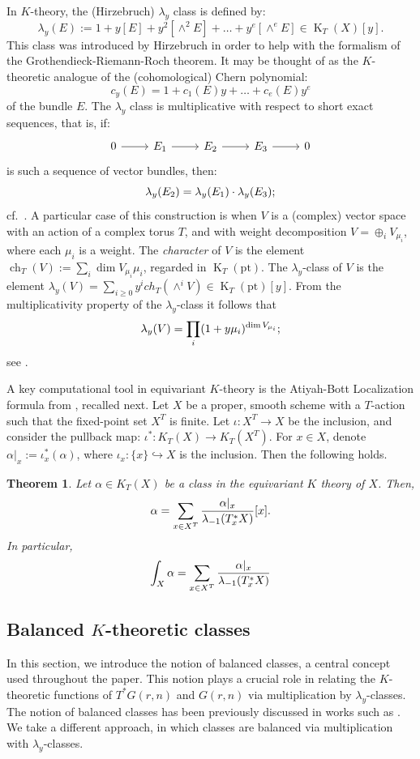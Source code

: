 \documentclass{amsart}
\newtheorem{thm}{Theorem}[section]
\DeclareMathOperator{\K}{K}
\DeclareMathOperator{\ch}{ch}
\begin{document}
In $K$-theory, the (Hirzebruch) $\lambda_y$ class is defined by: 
\[ \lambda_y(E) := 1 + y [E] + y^2 [\wedge^2 E] + \dots + y^e  [\wedge^e E] \in \K_T(X)[y]. \] 
This class was introduced by Hirzebruch \cite{MR1335917} in order to help with the 
formalism of the Grothendieck-Riemann-Roch theorem. It may be thought of as the 
$K$-theoretic analogue of the (cohomological) Chern polynomial: 
\[ c_y(E)= 1+ c_1(E) y + \ldots + c_e(E) y^e\] 
of the bundle $E$. 
The $\lambda_y$ class is multiplicative with respect to short exact sequences, that is, if: 
\[ \begin{tikzcd} 0 \arrow[r] & E_1 \arrow[r] & E_2 \arrow[r] & E_3 \arrow[r] & 0 \end{tikzcd} \] 
is such a sequence of vector bundles, then: 
\[ \lambda_y(E_2) = \lambda_y(E_1) \cdot \lambda_y(E_3) \/; \] 
cf.~\cite{MR1335917}. 
A particular case of this construction is when $V$ is a (complex) vector space with an action 
of a complex torus $T$, 
and with weight decomposition 
$V = \oplus_i V_{\mu_i}$, where each $\mu_i$ is a weight.
The {\em character} of $V$ is the element $\ch_T(V):=\sum_i \dim V_{\mu_i} {\mu_i}$, regarded  in $\K_T(\mathrm{pt})$.
The  $\lambda_y$-class of $V$ is the element 
$\lambda_y(V) =\sum_{i \ge 0} y^i ch_T(\wedge^i V) \in \K_T(\mathrm{pt})[y]$.
From the multiplicativity property of the $\lambda_y$-class it follows that 
\[\lambda_y(V) = \prod_i (1+y {\mu_i})^{\dim V_{\mu_i}} \/;\] 
see \cite{MR1335917}.

A key computational tool in equivariant $K$-theory is the Atiyah-Bott Localization formula from \cite{NIE}, recalled next.
Let $X$ be a proper, smooth scheme with a $T$-action such that the fixed-point set $X^T$ is finite. 
Let $\iota:X^T \to X$ 
be the inclusion, and consider the pullback map: 
$\iota^*: K_T(X) \to K_T(X^T)$. For $x \in X$, denote $\alpha|_x := \iota_x^*(\alpha)$, where $\iota_x: \{x\} \hookrightarrow X$ is the inclusion. Then the following holds.
\begin{thm}\label{Localization-Theorem} Let $\alpha \in K_T(X)$ be a class in the equivariant $K$ theory of $X$. Then,
\[
   \alpha  = \sum_{x \in X^T}\frac{\alpha\arrowvert_x}{\lambda_{-1}(T_x^*X)}[x] . 
\]
In particular, 
\begin{align*}
    \int_{X} \alpha = \sum_{x \in X^T}\frac{\alpha\arrowvert_x}{\lambda_{-1}(T_x^*X)}
\end{align*}
\end{thm}
\subsection{Balanced $K$-theoretic classes} \label{Balanced class} In this section, we introduce the notion of balanced classes, a central concept used throughout the paper. This notion plays a crucial role in relating the $K$-theoretic functions of $T^*G(r,n)$ and $G(r,n)$ via multiplication by $\lambda_y$-classes. 
The notion of balanced classes has been previously discussed in works such as \cite{Givental:2020, MR3752463} . 
We take a different approach, 
in which classes are balanced via multiplication with $\lambda_y$-classes.
\end{document}
